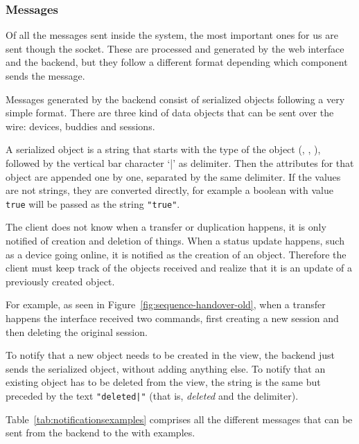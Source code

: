 \subsubsection{Messages} %
\label{ssub:messagesold}

Of all the messages sent inside the system, the most important ones for us are sent though the  socket.
These are processed and generated by the web interface and the  backend, but they follow a different format depending which component sends the message.

Messages generated by the backend consist of serialized objects following a very simple format.
There are three kind of data objects that can be sent over the wire: devices, buddies and sessions.

A serialized object is a string that starts with the type of the object (, , ), followed by the vertical bar character `|' as delimiter.
Then the attributes for that object are appended one by one, separated by the same delimiter.
If the values are not strings, they are converted directly, for example a boolean with value \texttt{true} will be passed as the string \texttt{"true"}.

The client does not know when a transfer or duplication happens, it is only notified of creation and deletion of things.
When a status update happens, such as a device going online, it is notified as the creation of an object.
Therefore the client must keep track of the objects received and realize that it is an update of a previously created object.

For example, as seen in Figure~\vref{fig:sequence-handover-old}, when a transfer happens the interface received two commands, first creating a new session and then deleting the original session.

To notify that a new object needs to be created in the view, the backend just sends the serialized object, without adding anything else.
To notify that an existing object has to be deleted from the view, the string is the same but preceded by the text \texttt{"deleted|"} (that is, \emph{deleted} and the delimiter).

Table~\vref{tab:notificationsexamples} comprises all the different messages that can be sent from the  backend to the  with examples.

